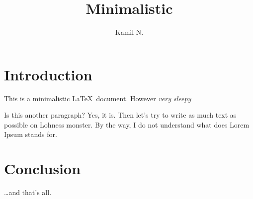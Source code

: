 \documentclass[a4paper,11pt]{article}
\author{Kamil N.}
\title{Minimalistic}
\begin{document}
\maketitle
\tableofcontents

\section{Introduction}
This is a minimalistic \LaTeX\ document. However \emph{very sleepy}

Is this another paragraph? Yes, it is. Then let's try to write as much text as possible on Lohness monster. By the way, I do not understand what does Lorem Ipsum stands for.

\section{Conclusion}
\ldots and that's all. \cite{example}
\printbibliography
\end{document}

